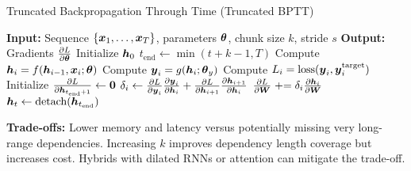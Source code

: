 \begin{algorithm}[h]
\caption{Truncated Backpropagation Through Time (Truncated BPTT)}
\label{alg:truncated-bptt}
\begin{algorithmic}[1]
\State \textbf{Input:} Sequence $\{\boldsymbol{x}_1, \ldots, \boldsymbol{x}_T\}$, parameters $\boldsymbol{\theta}$, chunk size $k$, stride $s$
\State \textbf{Output:} Gradients $\frac{\partial L}{\partial \boldsymbol{\theta}}$
\State
\State Initialize $\boldsymbol{h}_0$ 
\State
{}
    \State {}
    \State $t_{\text{end}} \leftarrow \min(t + k - 1, T)$
    \State
    \State {}
        \State Compute $\boldsymbol{h}_i = f(\boldsymbol{h}_{i-1}, \boldsymbol{x}_i; \boldsymbol{\theta})$
        \State Compute $\boldsymbol{y}_i = g(\boldsymbol{h}_i; \boldsymbol{\theta}_y)$
        \State Compute $L_i = \text{loss}(\boldsymbol{y}_i, \boldsymbol{y}_i^{\text{target}})$
    \EndFor
    \State
    \State {}
    \State Initialize $\frac{\partial L}{\partial \boldsymbol{h}_{t_{\text{end}}+1}} \leftarrow \boldsymbol{0}$
        \State $\delta_i \leftarrow \frac{\partial L}{\partial \boldsymbol{y}_i} \frac{\partial \boldsymbol{y}_i}{\partial \boldsymbol{h}_i} + \frac{\partial L}{\partial \boldsymbol{h}_{i+1}} \frac{\partial \boldsymbol{h}_{i+1}}{\partial \boldsymbol{h}_i}$
        \State $\frac{\partial L}{\partial \boldsymbol{W}} \mathrel{+}= \delta_i \frac{\partial \boldsymbol{h}_i}{\partial \boldsymbol{W}}$ 
    \EndFor
    \State
    \State {}
    \State $\boldsymbol{h}_t \leftarrow \text{detach}(\boldsymbol{h}_{t_{\text{end}}})$ 
\EndFor
\end{algorithmic}
\end{algorithm}

\textbf{Trade-offs:} Lower memory and latency versus potentially missing very long-range dependencies. Increasing $k$ improves dependency length coverage but increases cost. Hybrids with dilated RNNs or attention can mitigate the trade-off.


